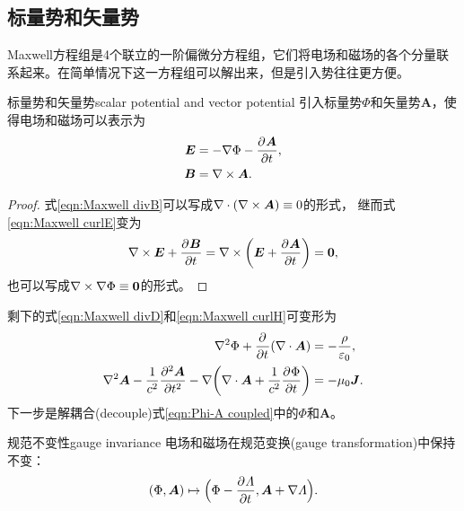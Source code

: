\subsection{标量势和矢量势}

Maxwell方程组是4个联立的一阶偏微分方程组，它们将电场和磁场的各个分量联系起来。在简单情况下这一方程组可以解出来，但是引入势往往更方便。

\begin{definition}
    {标量势和矢量势}{scalar potential and vector potential}
    引入标量势$\Phi$和矢量势$\bm A$，使得电场和磁场可以表示为
    \begin{subequations}
        \begin{align}
            \label{eqn:-nablaPhi-pApt}
            \bm E &= -\grad\Phi - \pv{\bm A}t,\\
            \label{eqn:curlA}
            \bm B &= \curl\bm A.
        \end{align}
    \end{subequations}
\end{definition}

\begin{proof}
    式\eqref{eqn:Maxwell divB}可以写成$\div(\curl\bm A) \equiv 0$的形式，
    继而式\eqref{eqn:Maxwell curlE}变为 
    \[
        \curl\bm E + \pv{\bm B}t = \curl\biggp{\bm E + \pv{\bm A}t} = \bm 0,
    \]
    也可以写成$\curl\grad\Phi \equiv \bm 0$的形式。
\end{proof}

\begin{corollary}
    剩下的式\eqref{eqn:Maxwell divD}和\eqref{eqn:Maxwell curlH}可变形为%
    \begin{subequations}
        \label{eqn:Phi-A coupled}
        \begin{align}
            \label{eqn:Phi-A coupled a}
            \laplacian\Phi + \pp t(\div\bm A) &= -\frac\rho{\varepsilon_0},\\
            \label{eqn:Phi-A coupled b}
            \laplacian\bm A - \frac1{c^2}\pv[2]{\bm A}t - \grad\biggp{\div\bm A + \frac1{c^2}\pv\Phi t} &= -\mu_0\bm J.
        \end{align}
    \end{subequations}
    下一步是解耦合(decouple)式\eqref{eqn:Phi-A coupled}中的$\Phi$和$\bm A$。
\end{corollary}

\begin{theorem}
    {规范不变性}{gauge invariance}
    电场和磁场在规范变换(gauge transformation)中保持不变：
    \begin{equation}
        (\Phi,\bm A) \mapsto \Bigp{\Phi - \pv\varLambda t,\bm A + \grad\varLambda}.
    \end{equation}
\end{theorem}

